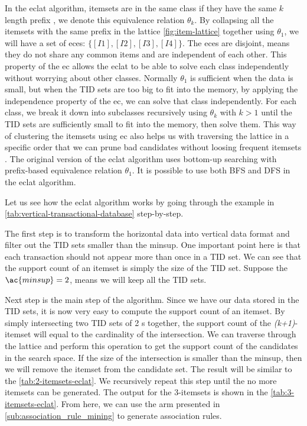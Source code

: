 
In the \ac{eclat} algorithm, itemsets are in the same class if they have the same $k$ length prefix \citep{zaki2000}, we denote this equivalence relation $\theta_k$.
By collapsing all the itemsets with the same prefix in the lattice \autoref{fig:item-lattice} together using $\theta_1$, we will have a set of \ac{ec}es: $\{[I1], [I2], [I3], [I4]\}$.
The \ac{ec}es are disjoint, means they do not share any common items and are independent of each other. %
This property of the \ac{ec} allows the \ac{eclat} to be able to solve each class independently without worrying about other classes.
Normally $\theta_1$ is sufficient when the data is small, but when the TID sets are too big to fit into the memory, by applying the independence property of the \ac{ec}, we can solve that class independently.
For each class, we break it down into subclasses recursively using $\theta_k$ with $k>1$ until the TID sets are sufficiently small to fit into the memory, then solve them.
This way of clustering the itemsets using \ac{ec} also helps us with traversing the lattice in a specific order that we can prune bad candidates without loosing frequent itemsets \citep{zaki2000}.
The original version of the \ac{eclat} algorithm uses bottom-up searching with prefix-based equivalence relation $\theta_1$.
It is possible to use both \ac{BFS} and \ac{DFS} in the \ac{eclat} algorithm.

Let us see how the \ac{eclat} algorithm works by going through the example in \autoref{tab:vertical-transactional-database} step-by-step.

The first step is to transform the horizontal data into vertical data format and filter out the \ac{TID} sets smaller than the \ac{minsup}.
One important point here is that each transaction should not appear more than once in a \ac{TID} set.
We can see that the support count of an itemset is simply the size of the \ac{TID} set.
Suppose the $\ac{minsup}=2$, means we will keep all the \ac{TID} sets.

Next step is the main step of the algorithm.
Since we have our data stored in the \ac{TID} sets, it is now very easy to compute the support count of an itemset.
By simply intersecting two \ac{TID} sets of 2 \kItemset s together, the support count of the \textit{(k+1)}-itemset will equal to the cardinality of the intersection.
We can traverse through the lattice and perform this operation to get the support count of the candidates in the search space.
If the size of the intersection is smaller than the \ac{minsup}, then we will remove the itemset from the candidate set.
The result will be similar to the \autoref{tab:2-itemsets-eclat}.
We recursively repeat this step until the no more itemsets can be generated.
The output for the 3-itemsets is shown in the \autoref{tab:3-itemsets-eclat}.
From here, we can use the \ac{arm} presented in \autoref{sub:association_rule_mining} to generate association rules.

